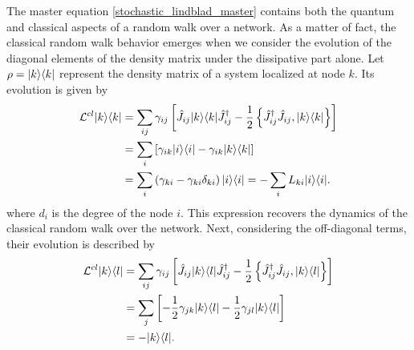 The master equation \eqref{stochastic_lindblad_master} contains both the quantum and classical aspects of a random walk over a network. As a matter of fact, the classical random walk behavior emerges when we consider the evolution of the diagonal elements of the density matrix under the dissipative part alone. Let $\rho = \lvert k\rangle\langle k\rvert$ represent the density matrix of a system localized at node $k$. Its evolution is given by
\begin{equation}
    \begin{split}
        \mathcal{L}^{cl}\lvert k\rangle\langle k\rvert &= \sum_{ij}\gamma_{ij}\left[\hat J_{ij} \lvert k\rangle\langle k\rvert\hat J_{ij}^\dagger -\frac{1}{2} \left\{ \hat J_{ij}^\dagger \hat J_{ij}, \lvert k\rangle\langle k\rvert\right\}\right]\\
        &= \sum_{i}\left[\gamma_{ik} \lvert i\rangle\langle i\rvert -\gamma_{ik}\lvert k\rangle\langle k\rvert\right]\\
        &=\sum_{i} \left(\gamma_{ki} - \gamma_{ki}\delta_{ki}\right) \lvert i\rangle\langle i\rvert = -\sum_i L_{ki} \lvert i\rangle\langle i\rvert.
    \end{split} 
\end{equation} 
where $d_i$ is the degree of the node $i$.
This expression recovers the dynamics of the classical random walk over the network.
Next, considering the off-diagonal terms, their evolution is described by
\begin{equation}
    \begin{split}
        \mathcal{L}^{cl}\lvert k\rangle\langle l\rvert &= \sum_{ij}\gamma_{ij}\left[\hat J_{ij} \lvert k\rangle\langle l\rvert\hat J_{ij}^\dagger -\frac{1}{2} \left\{ \hat J_{ij}^\dagger \hat J_{ij}, \lvert k\rangle\langle l\rvert\right\}\right]\\
        &= \sum_{j}\left[-\frac{1}{2} \gamma_{jk}\lvert k\rangle\langle l\rvert - \frac{1}{2} \gamma_{jl}\lvert k\rangle\langle l\rvert\right]\\
        &= -\lvert k\rangle\langle l\rvert.
    \end{split} 
\end{equation}

